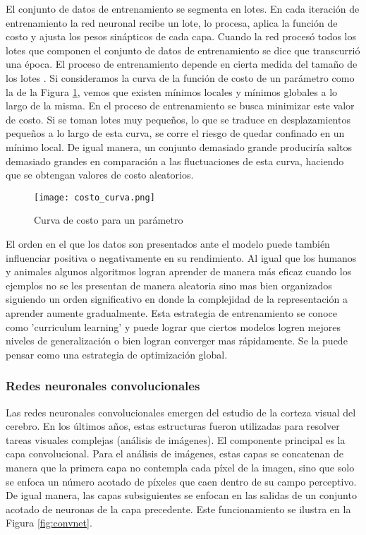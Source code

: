 El conjunto de datos de entrenamiento se segmenta en lotes. En cada iteración de entrenamiento la red neuronal recibe un lote, lo procesa, aplica la función de costo y ajusta los pesos sinápticos de cada capa. Cuando la red procesó todos los lotes que componen el conjunto de datos de entrenamiento se dice que transcurrió una época. El proceso de entrenamiento depende en cierta medida del tamaño de los lotes \cite{franchute}. Si consideramos la curva de la función de costo de un parámetro como la de la Figura \ref{fig:costo_curva}, vemos que existen mínimos locales y mínimos globales a lo largo de la misma. En el proceso de entrenamiento se busca minimizar este valor de costo. Si se toman lotes muy pequeños, lo que se traduce en desplazamientos pequeños a lo largo de esta curva, se corre el riesgo de quedar confinado en un mínimo local. De igual manera, un conjunto demasiado grande produciría saltos demasiado grandes en comparación a las fluctuaciones de esta curva, haciendo que se obtengan valores de costo aleatorios. 

\begin{figure}[H]
  \centering{}
  \texttt{[image: costo\_curva.png]}
  \caption{Curva de costo para un parámetro}
  \label{fig:costo_curva}
\end{figure}

El orden en el que los datos son presentados ante el modelo puede también influenciar positiva o negativamente en su rendimiento. Al igual que los humanos y animales algunos algoritmos logran aprender de manera más eficaz cuando los ejemplos no se les presentan de manera aleatoria sino mas bien organizados siguiendo un orden significativo en donde la complejidad de la representación a aprender aumente gradualmente. Esta estrategia de entrenamiento se conoce como 'curriculum learning' \cite{cv} y puede lograr que ciertos modelos logren mejores niveles de generalización o bien logran converger mas rápidamente. Se la puede pensar como una estrategia de optimización global. 

\subsubsection{Redes neuronales convolucionales}

Las redes neuronales convolucionales emergen del estudio de la corteza visual del cerebro. En los últimos años, estas estructuras fueron utilizadas para resolver tareas visuales complejas (análisis de imágenes). El componente principal es la capa convolucional. Para el análisis de imágenes, estas capas se concatenan de manera que la primera capa no contempla cada píxel de la imagen, sino que solo se enfoca un número acotado de píxeles que caen dentro de su campo perceptivo. De igual manera, las capas subsiguientes se enfocan en las salidas de un conjunto acotado de neuronas de la capa precedente. Este funcionamiento se ilustra en la Figura \ref{fig:convnet}. 

